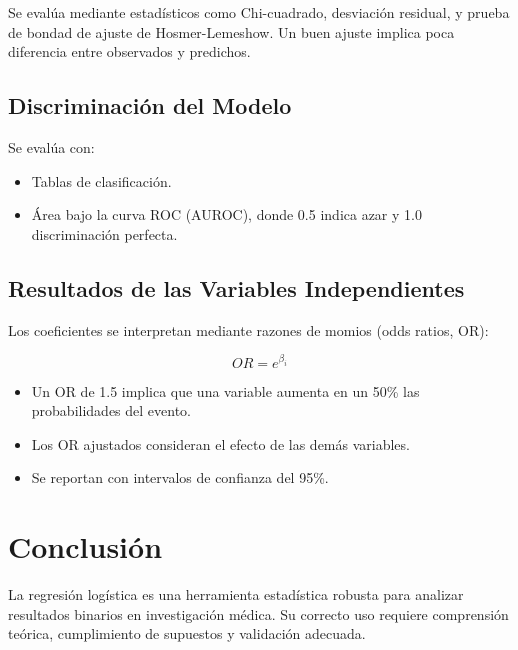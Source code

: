 \documentclass[12pt]{article}
\begin{document}
Se evalúa mediante estadísticos como Chi-cuadrado, desviación residual, y prueba de bondad de ajuste de Hosmer-Lemeshow. Un buen ajuste implica poca diferencia entre observados y predichos.

\subsection{Discriminación del Modelo}

Se evalúa con:
\begin{itemize}
  \item Tablas de clasificación.
  \item Área bajo la curva ROC (AUROC), donde 0.5 indica azar y 1.0 discriminación perfecta.
\end{itemize}

\subsection{Resultados de las Variables Independientes}

Los coeficientes se interpretan mediante razones de momios (odds ratios, OR):

\[
OR = e^{\beta_i}
\]

\begin{itemize}
  \item Un OR de 1.5 implica que una variable aumenta en un 50\% las probabilidades del evento.
  \item Los OR ajustados consideran el efecto de las demás variables.
  \item Se reportan con intervalos de confianza del 95\%.
\end{itemize}

\section{Conclusión}

La regresión logística es una herramienta estadística robusta para analizar resultados binarios en investigación médica. Su correcto uso requiere comprensión teórica, cumplimiento de supuestos y validación adecuada.
\end{document}
